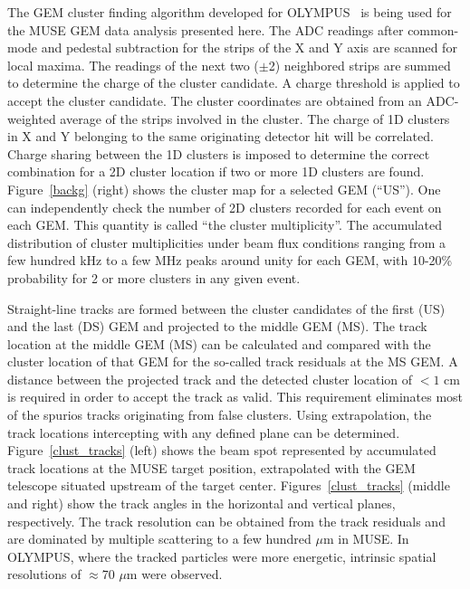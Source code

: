 \documentclass{PoS}
\begin{document}
The GEM cluster finding algorithm developed for OLYMPUS~\cite{hendersonH}
is being used for the MUSE GEM data analysis presented here.
The ADC readings after common-mode and pedestal subtraction for the strips
of the X and Y axis are scanned for local maxima. The readings of the next
two ($\pm$2) neighbored strips are summed to determine the charge of the
cluster candidate. A charge threshold is applied to accept the
cluster candidate. The cluster coordinates are obtained from an ADC-weighted
average of the strips involved in the cluster. The charge of 1D clusters
in X and Y belonging to the same originating detector hit will be correlated.
Charge sharing between the 1D clusters is imposed to determine the correct
combination for a 2D cluster location if two or more 1D clusters are found.
Figure~\ref{backg} (right) shows the cluster map for a selected GEM (``US'').
One can independently check the number of 2D clusters recorded for each event
on each GEM. This quantity is called ``the cluster multiplicity''.
The accumulated distribution of cluster multiplicities under beam flux
conditions ranging from a few hundred kHz to a few MHz peaks around unity for
each GEM, with 10-20\% probability for 2 or more clusters in any given event. 

Straight-line tracks are formed between the cluster candidates of the first
(US) and the last (DS) GEM and projected to the middle GEM (MS).
The track location at the middle GEM (MS) can be calculated and compared with
the cluster location of that GEM for the so-called track residuals at the
MS GEM. A distance between the projected track and the detected cluster
location of $< 1$ cm is required in order to accept the track as valid.
This requirement eliminates most of the spurios tracks originating from false
clusters.
Using extrapolation, the track locations intercepting with any defined plane
can be determined. Figure~\ref{clust_tracks} (left) shows the beam spot
represented by accumulated track locations at the MUSE target position,
extrapolated with the GEM telescope situated upstream of the target center.
Figures~\ref{clust_tracks} (middle and right) show the
track angles in the horizontal and vertical planes, respectively. The track
resolution can be obtained from the track residuals and are dominated
by multiple scattering to a few hundred $\mu$m in MUSE.
In OLYMPUS, where the tracked particles were more energetic, intrinsic spatial
resolutions of $\approx$70 $\mu$m were observed.
\end{document}
